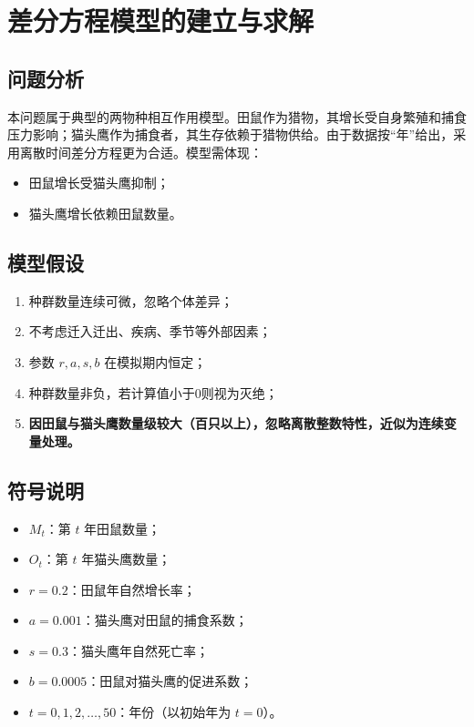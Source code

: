 \documentclass[12pt]{ctexart}
\begin{document}
\section{差分方程模型的建立与求解}
\subsection{问题分析}
本问题属于典型的两物种相互作用模型。田鼠作为猎物，其增长受自身繁殖和捕食压力影响；猫头鹰作为捕食者，其生存依赖于猎物供给。由于数据按“年”给出，采用离散时间差分方程更为合适。模型需体现：
\begin{itemize}
    \item 田鼠增长受猫头鹰抑制；
    \item 猫头鹰增长依赖田鼠数量。
\end{itemize}

\subsection{模型假设}
\begin{enumerate}
    \item 种群数量连续可微，忽略个体差异；
    \item 不考虑迁入迁出、疾病、季节等外部因素；
    \item 参数 $r, a, s, b$ 在模拟期内恒定；
    \item 种群数量非负，若计算值小于0则视为灭绝；
    \item \textbf{因田鼠与猫头鹰数量级较大（百只以上），忽略离散整数特性，近似为连续变量处理。}
\end{enumerate}

\subsection{符号说明}
\begin{itemize}
    \item $M_t$：第 $t$ 年田鼠数量；
    \item $O_t$：第 $t$ 年猫头鹰数量；
    \item $r = 0.2$：田鼠年自然增长率；
    \item $a = 0.001$：猫头鹰对田鼠的捕食系数；
    \item $s = 0.3$：猫头鹰年自然死亡率；
    \item $b = 0.0005$：田鼠对猫头鹰的促进系数；
    \item $t = 0, 1, 2, \dots, 50$：年份（以初始年为 $t=0$）。
\end{itemize}
\end{document}
